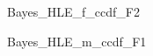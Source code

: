 \documentclass[a4j,11pt,mc, twocolumn]{jreport}
\begin{document}
	\begin{figure}[h!]
		\begin{center}
				\caption{Bayes\_HLE\_f\_ccdf\_F2}
		\end{center}
	\end{figure}



	\begin{figure}[h!]
		\begin{center}
				\caption{Bayes\_HLE\_m\_ccdf\_F1}
		\end{center}
	\end{figure}
\end{document}
